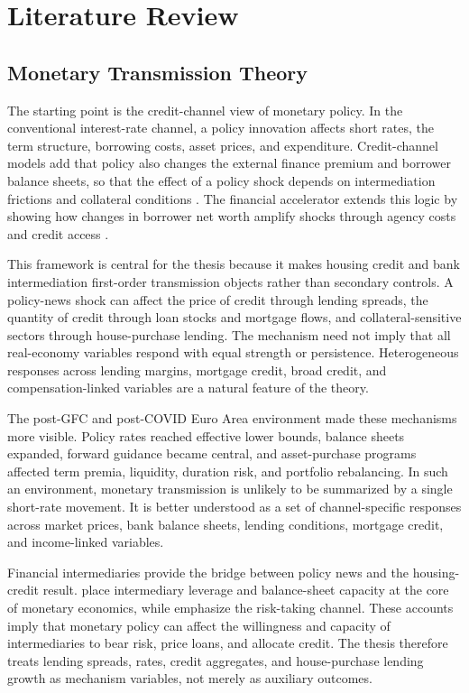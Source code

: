 \chapter{Literature Review}
\label{chap:literature}

\section{Monetary Transmission Theory}

The starting point is the credit-channel view of monetary policy. In the conventional interest-rate channel, a policy innovation affects short rates, the term structure, borrowing costs, asset prices, and expenditure. Credit-channel models add that policy also changes the external finance premium and borrower balance sheets, so that the effect of a policy shock depends on intermediation frictions and collateral conditions \parencite{BernankeGertler1995}. The financial accelerator extends this logic by showing how changes in borrower net worth amplify shocks through agency costs and credit access \parencite{BernankeGertlerGilchrist1999}.

This framework is central for the thesis because it makes housing credit and bank intermediation first-order transmission objects rather than secondary controls. A policy-news shock can affect the price of credit through lending spreads, the quantity of credit through loan stocks and mortgage flows, and collateral-sensitive sectors through house-purchase lending. The mechanism need not imply that all real-economy variables respond with equal strength or persistence. Heterogeneous responses across lending margins, mortgage credit, broad credit, and compensation-linked variables are a natural feature of the theory.

The post-GFC and post-COVID Euro Area environment made these mechanisms more visible. Policy rates reached effective lower bounds, balance sheets expanded, forward guidance became central, and asset-purchase programs affected term premia, liquidity, duration risk, and portfolio rebalancing. In such an environment, monetary transmission is unlikely to be summarized by a single short-rate movement. It is better understood as a set of channel-specific responses across market prices, bank balance sheets, lending conditions, mortgage credit, and income-linked variables.

Financial intermediaries provide the bridge between policy news and the housing-credit result. \textcite{AdrianShin2010} place intermediary leverage and balance-sheet capacity at the core of monetary economics, while \textcite{BorioZhu2012} emphasize the risk-taking channel. These accounts imply that monetary policy can affect the willingness and capacity of intermediaries to bear risk, price loans, and allocate credit. The thesis therefore treats lending spreads, rates, credit aggregates, and house-purchase lending growth as mechanism variables, not merely as auxiliary outcomes.

